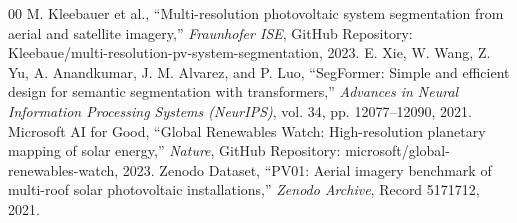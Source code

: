 \documentclass[conference]{IEEEtran}
\begin{document}
\begin{thebibliography}{00}
 M. Kleebauer et al., ``Multi-resolution photovoltaic system segmentation from aerial and satellite imagery,'' \textit{Fraunhofer ISE}, GitHub Repository: Kleebaue/multi-resolution-pv-system-segmentation, 2023.
 E. Xie, W. Wang, Z. Yu, A. Anandkumar, J. M. Alvarez, and P. Luo, ``SegFormer: Simple and efficient design for semantic segmentation with transformers,'' \textit{Advances in Neural Information Processing Systems (NeurIPS)}, vol. 34, pp. 12077--12090, 2021.
 Microsoft AI for Good, ``Global Renewables Watch: High-resolution planetary mapping of solar energy,'' \textit{Nature}, GitHub Repository: microsoft/global-renewables-watch, 2023.
 Zenodo Dataset, ``PV01: Aerial imagery benchmark of multi-roof solar photovoltaic installations,'' \textit{Zenodo Archive}, Record 5171712, 2021.
\end{thebibliography}
\end{document}
